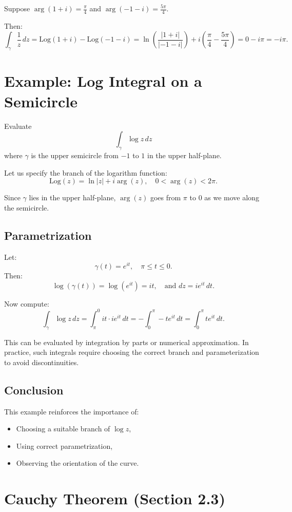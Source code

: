 \documentclass[12pt]{article}
\theoremstyle{definition} %
\theoremstyle{plain} %
\begin{document}
Suppose $\arg(1+i) = \frac{\pi}{4}$ and $\arg(-1 - i) = \frac{5\pi}{4}$.

Then:
\[
\int_{\gamma} \frac{1}{z}\,dz = \text{Log}(1+i) - \text{Log}(-1 - i) = \ln\left( \frac{|1+i|}{|-1 - i|} \right) + i\left( \frac{\pi}{4} - \frac{5\pi}{4} \right)
= 0 - i\pi = -i\pi.
\]

\section*{Example: Log Integral on a Semicircle}

Evaluate
\[
\int_{\gamma} \log z\,dz
\]
where $\gamma$ is the upper semicircle from $-1$ to $1$ in the upper half-plane.

Let us specify the branch of the logarithm function:
\[
\text{Log}(z) = \ln|z| + i \arg(z), \quad 0 < \arg(z) < 2\pi.
\]

Since $\gamma$ lies in the upper half-plane, $\arg(z)$ goes from $\pi$ to $0$ as we move along the semicircle.

\subsection*{Parametrization}

Let:
\[
\gamma(t) = e^{it}, \quad \pi \leq t \leq 0.
\]
Then:
\[
\log(\gamma(t)) = \log(e^{it}) = it, \quad \text{and } dz = i e^{it}\,dt.
\]

Now compute:
\[
\int_{\gamma} \log z\,dz = \int_{\pi}^0 it \cdot i e^{it}\,dt = -\int_0^{\pi} -t e^{it}\,dt = \int_0^{\pi} t e^{it}\,dt.
\]

This can be evaluated by integration by parts or numerical approximation. In practice, such integrals require choosing the correct branch and parameterization to avoid discontinuities.

\subsection*{Conclusion}

This example reinforces the importance of:
\begin{itemize}
    \item Choosing a suitable branch of $\log z$,
    \item Using correct parametrization,
    \item Observing the orientation of the curve.
\end{itemize}


\section*{Cauchy Theorem (Section 2.3)}
\end{document}
